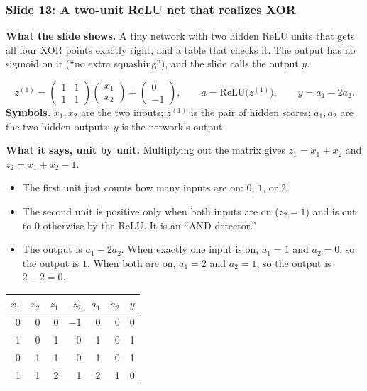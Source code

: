\subsubsection{Slide 13: A two-unit ReLU net that realizes XOR}

\textbf{What the slide shows.} A tiny network with two hidden ReLU units that gets all four XOR points exactly right, and a table that checks it. The output has no sigmoid on it (``no extra squashing''), and the slide calls the output $y$.

\[
z^{(1)} = \begin{pmatrix}1&1\\1&1\end{pmatrix}\begin{pmatrix}x_1\\x_2\end{pmatrix} + \begin{pmatrix}0\\-1\end{pmatrix}, \qquad a = \text{ReLU}\big(z^{(1)}\big), \qquad y = a_1 - 2a_2 .
\]
\textbf{Symbols.} $x_1,x_2$ are the two inputs; $z^{(1)}$ is the pair of hidden scores; $a_1,a_2$ are the two hidden outputs; $y$ is the network's output.

\textbf{What it says, unit by unit.} Multiplying out the matrix gives $z_1 = x_1+x_2$ and $z_2 = x_1+x_2-1$.
\begin{itemize}
\item The first unit just counts how many inputs are on: $0$, $1$, or $2$.
\item The second unit is positive only when both inputs are on ($z_2 = 1$) and is cut to $0$ otherwise by the ReLU. It is an ``AND detector.''
\item The output is $a_1 - 2a_2$. When exactly one input is on, $a_1 = 1$ and $a_2 = 0$, so the output is $1$. When both are on, $a_1 = 2$ and $a_2 = 1$, so the output is $2 - 2 = 0$.
\end{itemize}

\begin{center}
\begin{tabular}{rrrrrrr}
\toprule
$x_1$ & $x_2$ & $z_1$ & $z_2$ & $a_1$ & $a_2$ & $y$ \\
\midrule
0 & 0 & 0 & $-1$ & 0 & 0 & 0 \\
1 & 0 & 1 & 0 & 1 & 0 & 1 \\
0 & 1 & 1 & 0 & 1 & 0 & 1 \\
1 & 1 & 2 & 1 & 2 & 1 & 0 \\
\bottomrule
\end{tabular}
\end{center}


